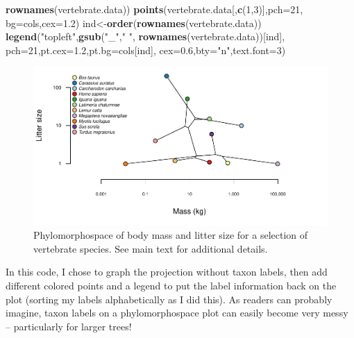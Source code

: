 \documentclass[fleqn,10pt,lineno]{wlpeerj} %
\newenvironment{Shaded}{\begin{snugshade}}{\end{snugshade}}
\newcommand{\AttributeTok}[1]{\textcolor[rgb]{0.13,0.29,0.53}{#1}}
\newcommand{\DecValTok}[1]{\textcolor[rgb]{0.00,0.00,0.81}{#1}}
\newcommand{\FloatTok}[1]{\textcolor[rgb]{0.00,0.00,0.81}{#1}}
\newcommand{\FunctionTok}[1]{\textcolor[rgb]{0.13,0.29,0.53}{\textbf{#1}}}
\newcommand{\NormalTok}[1]{#1}
\newcommand{\OtherTok}[1]{\textcolor[rgb]{0.56,0.35,0.01}{#1}}
\newcommand{\StringTok}[1]{\textcolor[rgb]{0.31,0.60,0.02}{#1}}
\begin{document}
\begin{Shaded}
\begin{Highlighting}[]
  \FunctionTok{rownames}\NormalTok{(vertebrate.data))}
\FunctionTok{points}\NormalTok{(vertebrate.data[,}\FunctionTok{c}\NormalTok{(}\DecValTok{1}\NormalTok{,}\DecValTok{3}\NormalTok{)],}\AttributeTok{pch=}\DecValTok{21}\NormalTok{,}
  \AttributeTok{bg=}\NormalTok{cols,}\AttributeTok{cex=}\FloatTok{1.2}\NormalTok{)}
\NormalTok{ind}\OtherTok{\textless{}{-}}\FunctionTok{order}\NormalTok{(}\FunctionTok{rownames}\NormalTok{(vertebrate.data))}
\FunctionTok{legend}\NormalTok{(}\StringTok{"topleft"}\NormalTok{,}\FunctionTok{gsub}\NormalTok{(}\StringTok{"\_"}\NormalTok{,}\StringTok{" "}\NormalTok{,}
  \FunctionTok{rownames}\NormalTok{(vertebrate.data))[ind],}
  \AttributeTok{pch=}\DecValTok{21}\NormalTok{,}\AttributeTok{pt.cex=}\FloatTok{1.2}\NormalTok{,}\AttributeTok{pt.bg=}\NormalTok{cols[ind],}
  \AttributeTok{cex=}\FloatTok{0.6}\NormalTok{,}\AttributeTok{bty=}\StringTok{"n"}\NormalTok{,}\AttributeTok{text.font=}\DecValTok{3}\NormalTok{)}
\end{Highlighting}
\end{Shaded}

\begin{figure}
\includegraphics[width=1\linewidth]{Revell.phytools-v2_peerj_files/figure-latex/vert-phylomorphospace-1} \caption{Phylomorphospace of body mass and litter size for a selection of vertebrate species. See main text for additional details.}\label{fig:vert-phylomorphospace}
\end{figure}

In this code, I chose to graph the projection without taxon labels, then add different colored points and a legend to put the label information back on the plot (sorting my labels alphabetically as I did this). As readers can probably imagine, taxon labels on a phylomorphospace plot can easily become very messy -- particularly for larger trees!
\end{document}
